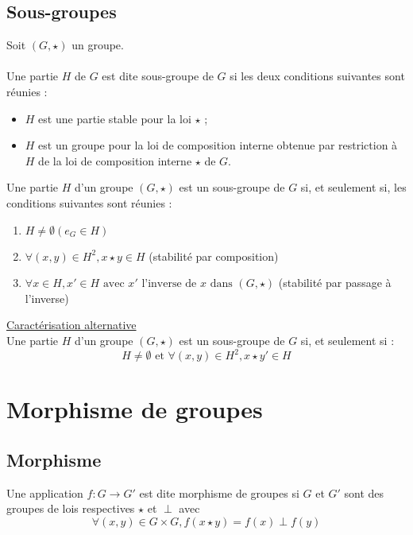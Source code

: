 \subsection{Sous-groupes}
\begin{defi}
    Soit \((G, \star)\) un groupe.\\~\\
    Une partie \(H\) de \(G\) est dite sous-groupe de \(G\) si les deux conditions suivantes sont réunies :
    \begin{itemize}
        \item \(H\) est une partie stable pour la loi \(\star\) ;
        \item \(H\) est un groupe pour la loi de composition interne obtenue par restriction à \(H\) de la loi de composition interne \(\star\) de \(G\).
    \end{itemize}
\end{defi}

\begin{defprop}[Caractérisation]
    Une partie \(H\) d’un groupe \((G, \star)\) est un sous-groupe de \(G\) si, et seulement si, les conditions suivantes sont réunies :
    \begin{enumerate}
        \item \(H \neq \emptyset \)\hfill \((e_G \in H)\)
        \item \(\forall (x, y) \in H^2, x \star y \in  H \) \hfill (stabilité par composition)
        \item \(\forall x \in H, x' \in H \text{ avec } x' \text{ l’inverse de } x \text{ dans } (G, \star)\) \hfill (stabilité par passage à l’inverse)
    \end{enumerate}
    \underline{Caractérisation alternative}\\
    Une partie \(H\) d’un groupe \((G, \star)\) est un sous-groupe de \(G\) si, et seulement si :
    \[H \neq \emptyset \text{ et } \forall (x, y) \in H^2, x \star y' \in H\]
\end{defprop}

\section{Morphisme de groupes}
\subsection{Morphisme}
\begin{defi}
    Une application \(f : G \to G'\) est dite morphisme de groupes si \(G\) et \(G'\) sont des groupes de lois respectives \(\star\) et \(\perp\) avec
    \[\forall (x, y) \in G \times G, f (x \star y) = f (x) \perp f (y)\]
\end{defi}

